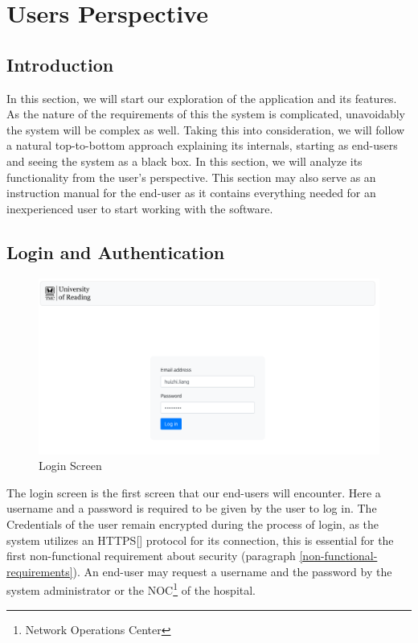 \chapter{Users Perspective}
\label{users_perspective}
	\section{Introduction}
		In this section, we will start our exploration of the application and its features. As the nature of the requirements of this
		the system is complicated, unavoidably the system will be complex as well. Taking this into consideration, we will follow a natural top-to-bottom
		approach explaining its internals, starting as end-users and seeing the system as a black box. In this section, we will analyze its 
		functionality from the user's perspective. This section may also serve as an instruction manual for the end-user as it contains everything needed
		for an inexperienced user to start working with the software.
	\section{Login and Authentication}
		\begin{figure}[H]
			\iftrue
			\centering
			\caption{Login Screen}
			\includegraphics[scale=0.3]{figures/login}
			\fi
		\end{figure}
		The login screen is the first screen that our end-users will encounter. Here a username and a password is required to be given by the 
		user to log in. The Credentials of the user remain encrypted during the process of login, as the system utilizes an HTTPS[\cite{rfc2818}] 
		protocol for its connection, this is essential for the first non-functional requirement about security (paragraph \ref{non-functional-requirements}).
		An end-user may request a username and the password by the system administrator or the NOC\footnote{Network Operations Center} of the hospital.
